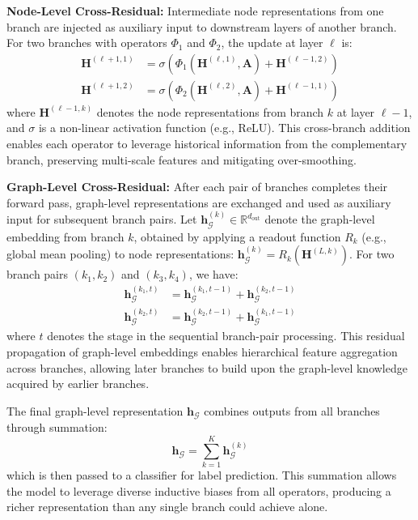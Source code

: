 \textbf{Node-Level Cross-Residual:} Intermediate node representations from one branch are injected as auxiliary input to downstream layers of another branch. For two branches with operators $\Phi_1$ and $\Phi_2$, the update at layer $\ell$ is:
\begin{align}
\mathbf{H}^{(\ell+1, 1)} &= \sigma\left(\Phi_1\left(\mathbf{H}^{(\ell, 1)}, \mathbf{A}\right) + \mathbf{H}^{(\ell-1, 2)}\right) \label{eq:node_cross_1} \\
\mathbf{H}^{(\ell+1, 2)} &= \sigma\left(\Phi_2\left(\mathbf{H}^{(\ell, 2)}, \mathbf{A}\right) + \mathbf{H}^{(\ell-1, 1)}\right) \label{eq:node_cross_2}
\end{align}
where $\mathbf{H}^{(\ell-1, k)}$ denotes the node representations from branch $k$ at layer $\ell-1$, and $\sigma$ is a non-linear activation function (e.g., ReLU). This cross-branch addition enables each operator to leverage historical information from the complementary branch, preserving multi-scale features and mitigating over-smoothing.

\textbf{Graph-Level Cross-Residual:} After each pair of branches completes their forward pass, graph-level representations are exchanged and used as auxiliary input for subsequent branch pairs. Let $\mathbf{h}_{\mathcal{G}}^{(k)} \in \mathbb{R}^{d_{\text{out}}}$ denote the graph-level embedding from branch $k$, obtained by applying a readout function $R_k$ (e.g., global mean pooling) to node representations: $\mathbf{h}_{\mathcal{G}}^{(k)} = R_k(\mathbf{H}^{(L, k)})$. For two branch pairs $(k_1, k_2)$ and $(k_3, k_4)$, we have:
\begin{align}
\mathbf{h}_{\mathcal{G}}^{(k_1, t)} &= \mathbf{h}_{\mathcal{G}}^{(k_1, t-1)} + \mathbf{h}_{\mathcal{G}}^{(k_2, t-1)} \label{eq:graph_cross_1} \\
\mathbf{h}_{\mathcal{G}}^{(k_2, t)} &= \mathbf{h}_{\mathcal{G}}^{(k_2, t-1)} + \mathbf{h}_{\mathcal{G}}^{(k_1, t-1)} \label{eq:graph_cross_2}
\end{align}
where $t$ denotes the stage in the sequential branch-pair processing. This residual propagation of graph-level embeddings enables hierarchical feature aggregation across branches, allowing later branches to build upon the graph-level knowledge acquired by earlier branches.

The final graph-level representation $\mathbf{h}_{\mathcal{G}}$ combines outputs from all branches through summation:
\begin{equation}
\mathbf{h}_{\mathcal{G}} = \sum_{k=1}^{K} \mathbf{h}_{\mathcal{G}}^{(k)}
\end{equation}
which is then passed to a classifier for label prediction. This summation allows the model to leverage diverse inductive biases from all operators, producing a richer representation than any single branch could achieve alone.

